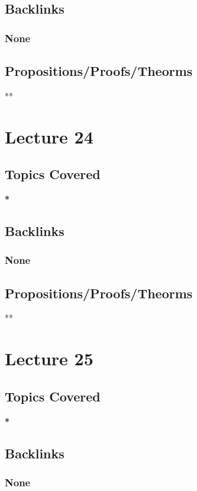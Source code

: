 \documentclass[11pt]{article}
\begin{document}
\subsection*{Backlinks}
\label{sec:org09e198f}
\subsubsection*{None}
\label{sec:orgddf71a8}
\subsection*{Propositions/Proofs/Theorms}
\label{sec:orged07ae6}
**

\section*{Lecture 24}
\label{sec:org33131ca}
\subsection*{Topics Covered}
\label{sec:org148202d}
\textbf{*}
\subsection*{Backlinks}
\label{sec:orgfdde571}
\subsubsection*{None}
\label{sec:orgd4b9851}
\subsection*{Propositions/Proofs/Theorms}
\label{sec:org27e5b7e}
**

\section*{Lecture 25}
\label{sec:org6ad8522}
\subsection*{Topics Covered}
\label{sec:org2ef6ab0}
\textbf{*}
\subsection*{Backlinks}
\label{sec:orga11dd1b}
\subsubsection*{None}
\label{sec:org4aab858}
\end{document}

